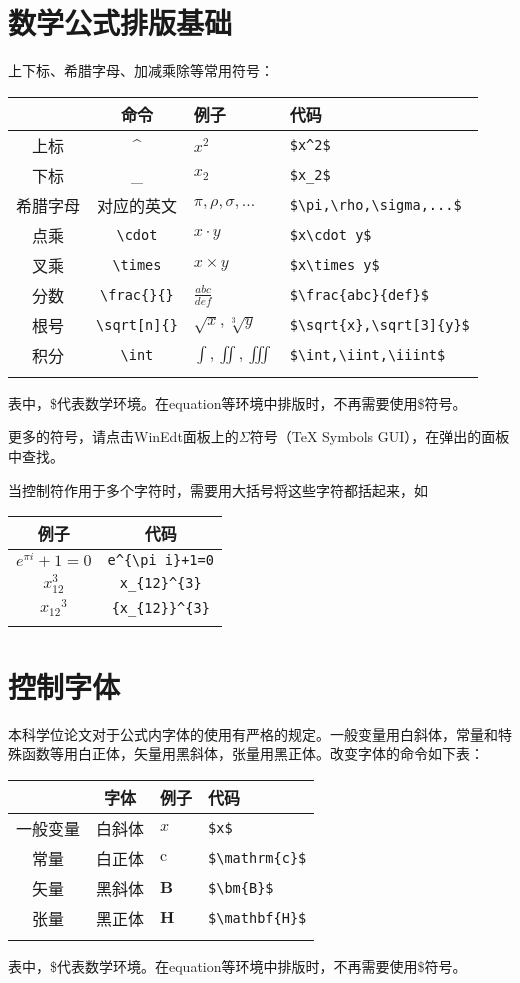 \section{数学公式排版基础}
上下标、希腊字母、加减乘除等常用符号：
\begin{center}
\begin{tabular}{ccll}
\whline
& 命令 & 例子 & 代码\\
\hline
上标 & \^{} & $x^2$ & \verb|$x^2$|\\
下标 & \_{} & $x_2$ & \verb|$x_2$|\\
希腊字母 & 对应的英文 & $\pi,\rho,\sigma,...$ &\verb|$\pi,\rho,\sigma,...$|\\
点乘 & \verb|\cdot| & $x\cdot y$ & \verb|$x\cdot y$|\\
叉乘 & \verb|\times| & $x\times y$ & \verb|$x\times y$|\\
分数 & \verb|\frac{}{}| & $\frac{abc}{def}$ &\verb|$\frac{abc}{def}$|\\
根号 & \verb|\sqrt[n]{}|  & $\sqrt{x},\sqrt[3]{y}$ &\verb|$\sqrt{x},\sqrt[3]{y}$|\\
积分 &\verb|\int|  & $\int,\iint,\iiint$ & \verb|$\int,\iint,\iiint$|\\
\whline
\end{tabular}
\end{center}
表中，\$代表数学环境。在equation等环境中排版时，不再需要使用\$符号。

更多的符号，请点击WinEdt面板上的$\Sigma$符号（TeX Symbols GUI），在弹出的面板中查找。

当控制符作用于多个字符时，需要用大括号将这些字符都括起来，如
\begin{center}
\begin{tabular}{c c}
\whline
例子 & 代码\\
\hline
$e^{\pi i}+1=0$ & \verb|e^{\pi i}+1=0|\\
$x_{12}^{3}$ & \verb|x_{12}^{3}|\\
${x_{12}}^{3}$ & \verb|{x_{12}}^{3}|\\
\whline
\end{tabular}
\end{center}

\section{控制字体}
本科学位论文对于公式内字体的使用有严格的规定。一般变量用白斜体，常量和特殊函数等用白正体，矢量用黑斜体，张量用黑正体。改变字体的命令如下表：
\begin{center}
\begin{tabular}{c c l l}
\whline
& 字体 & 例子 & 代码\\
\hline
一般变量 & 白斜体 & $x$ & \verb|$x$|\\
常量  & 白正体 & $\mathrm{c}$  & \verb|$\mathrm{c}$|\\
矢量  & 黑斜体 & $\bm{B}$ & \verb|$\bm{B}$|\\
张量  & 黑正体 & $\mathbf{H}$ & \verb|$\mathbf{H}$|\\
\whline
\end{tabular}
\end{center}
表中，\$代表数学环境。在equation等环境中排版时，不再需要使用\$符号。

